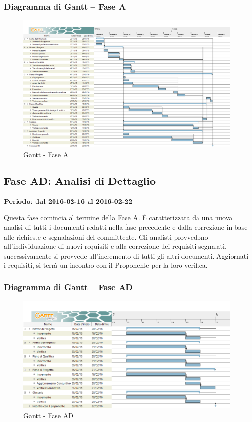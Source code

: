 \documentclass[../PianoProgetto.tex]{subfiles}
\begin{document}
		\subsubsection{Diagramma di Gantt – Fase A}
			\begin{figure}[!h]
				\centering
				\includegraphics[width=\textwidth]{gantt_png/1-analisi}
				\caption{Gantt - Fase A}
				\label{fig:Gantt - Fase A}
			\end{figure}			
	
	\subsection{Fase AD: Analisi di Dettaglio}
		\textbf{Periodo: dal 2016-02-16 al 2016-02-22}

				Questa fase comincia al termine della Fase A. È caratterizzata da una nuova analisi di tutti i documenti redatti nella fase precedente e dalla correzione in base alle richieste e segnalazioni del committente. Gli analisti provvedono all'individuazione di nuovi requisiti e alla correzione dei requisiti segnalati, successivamente si provvede all'incremento di tutti gli altri documenti.  Aggiornati i requisiti, si terrà un incontro con il Proponente per la loro verifica.
		\newpage			
		\subsubsection{Diagramma di Gantt – Fase AD}
			\begin{figure}[!h]
				\centering
				\includegraphics[width=\textwidth]{gantt_png/2-analisi_di_dettaglio}
				\caption{Gantt - Fase AD}
				\label{fig:Gantt - Fase AD}
			\end{figure}
\end{document}
